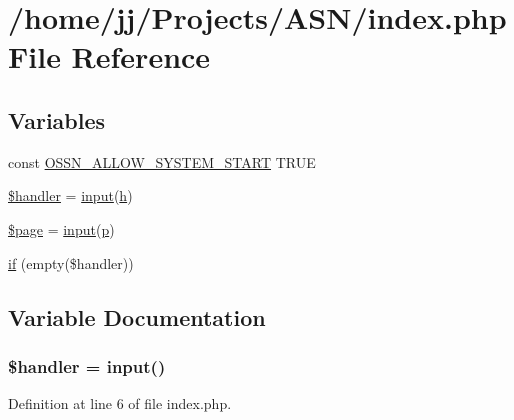 \hypertarget{index_8php}{}\section{/home/jj/\+Projects/\+A\+S\+N/index.php File Reference}
\label{index_8php}
\subsection*{Variables}
\begin{DoxyCompactItemize}
\item 
const \hyperlink{index_8php_a73aeae1243c8451cb328ddfe84637175}{O\+S\+S\+N\+\_\+\+A\+L\+L\+O\+W\+\_\+\+S\+Y\+S\+T\+E\+M\+\_\+\+S\+T\+A\+RT} T\+R\+UE
\item 
\hyperlink{index_8php_a9285a7f684c72e9bb78fdef1bcbe3fd0}{\$handler} = \hyperlink{ossn_8lib_8input_8php_a64ebee98b041c4f75f71ed3cd73cc8ed}{input}(\textquotesingle{}\hyperlink{jquery-ui_8min_8js_a79fe0eb780a2a4b5543b4dddf8b6188a}{h}\textquotesingle{})
\item 
\hyperlink{index_8php_a0a44e6760141442bb439b1ab1395d8ff}{\$page} = \hyperlink{ossn_8lib_8input_8php_a64ebee98b041c4f75f71ed3cd73cc8ed}{input}(\textquotesingle{}\hyperlink{jquery-ui_8min_8js_ad1707b001240e9c8298830073364c8bf}{p}\textquotesingle{})
\item 
\hyperlink{index_8php_a6805d5faa240e2f48a9243c6c6b71a9e}{if} (empty(\$handler))
\end{DoxyCompactItemize}


\subsection{Variable Documentation}
\subsubsection[{\texorpdfstring{\$handler}{$handler}}]{\setlength{\rightskip}{0pt plus 5cm}\$handler = {\bf input}(\textquotesingle{})}\hypertarget{index_8php_a9285a7f684c72e9bb78fdef1bcbe3fd0}{}\label{index_8php_a9285a7f684c72e9bb78fdef1bcbe3fd0}


Definition at line 6 of file index.\+php.


